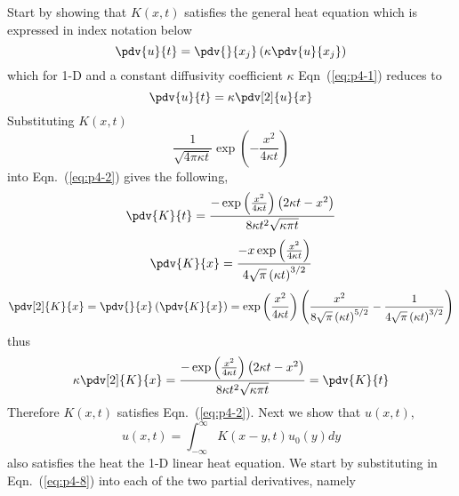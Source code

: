 \newcommand{\Keq}[1]{\frac{1}{\sqrt{4 \pi \kappa t}} \exp\left( -\frac{#1^{2}}{4 \kappa t} \right)}
\newcommand{\kxt}{K\left(x,t\right)}
\newcommand{\kgen}[2]{K\left(#1,#2\right)}
\newcommand{\uxt}{u\left(x,t\right)}
\newcommand{\uo}{u_{0}\left( y \right)}
Start by showing that $\kxt$ satisfies the general heat equation which is expressed in index
notation below
\begin{equation}
    \pdv{u}{t} = \pdv{}{x_{j}}\left( \kappa \pdv{u}{x_{j}} \right)
    \label{eq:p4-1}
\end{equation}
which for 1-D and a constant diffusivity coefficient $\kappa$ Eqn~(\ref{eq:p4-1}) reduces to 
\begin{equation}
    \pdv{u}{t} = \kappa \pdv[2]{u}{x}
    \label{eq:p4-2}
\end{equation}
Substituting $\kxt$
\begin{equation}
    \Keq{x}
    \label{eq:p4-3}
\end{equation}
into Eqn.~(\ref{eq:p4-2}) gives the following,
\begin{equation}
    \pdv{K}{t} = \frac{ -\exp\left(\frac{x^{2}}{4 \kappa t}\right) \left(2 \kappa t - x^{2}\right) }{8 \kappa t^{2} \sqrt{\kappa \pi t}}
    \label{eq:p4-4}
\end{equation}
\begin{equation}
    \pdv{K}{x} = \frac{ -x \exp\left(\frac{x^{2}}{4 \kappa t}\right) }{4 \sqrt{\pi} \left(\kappa t \right)^{3/2}}
    \label{eq:p4-5}
\end{equation}
\begin{equation}
    \pdv[2]{K}{x}  = \pdv{}{x}\left(\pdv{K}{x}\right) = \exp\left(\frac{x^{2}}{4 \kappa t}\right)
    \left(\frac{x^{2}}{8\sqrt{\pi} \left(\kappa t \right)^{5/2}} - \frac{1}{ 4\sqrt{\pi} \left(\kappa t \right)^{3/2} } \right)
    \label{eq:p4-6}
\end{equation}
thus
\begin{equation}
    \kappa \pdv[2]{K}{x} = \frac{ -\exp\left(\frac{x^{2}}{4 \kappa t}\right) \left(2 \kappa t - x^{2}\right) }{8 \kappa t^{2} \sqrt{\kappa \pi t}}  = \pdv{K}{t}
    \label{eq:p4-7}
\end{equation}
Therefore $\kxt$ satisfies Eqn.~(\ref{eq:p4-2}). Next we show that $\uxt$, 
\begin{equation}
    \uxt = \int_{-\infty}^{\infty} \kgen{x-y}{t}\uo dy 
    \label{eq:p4-8}
\end{equation}
also satisfies the heat the 1-D linear heat equation. We start by substituting in
Eqn.~(\ref{eq:p4-8}) into each of the two partial derivatives, namely
